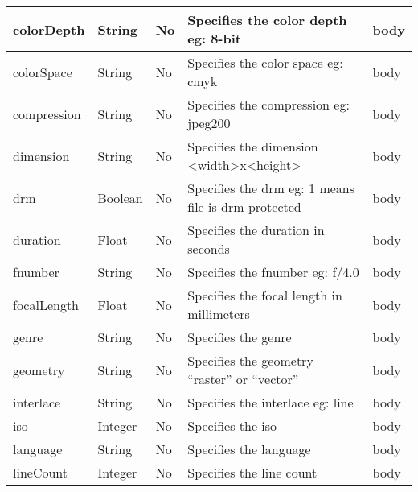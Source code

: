 \begin{longtable}{|>{\raggedright}p{}|>{\raggedright}p{}|>{\raggedright}p{}|>{\raggedright}p{}|>{\raggedright}p{}|}
\hline 
{\footnotesize{colorDepth}} & {\footnotesize{String}} & {\footnotesize{No}} & {\footnotesize{Specifies the color depth eg: 8-bit}} & {\footnotesize{body}}\tabularnewline
\hline 
{\footnotesize{colorSpace}} & {\footnotesize{String}} & {\footnotesize{No}} & {\footnotesize{Specifies the color space eg: cmyk}} & {\footnotesize{body}}\tabularnewline
\hline 
{\footnotesize{compression}} & {\footnotesize{String}} & {\footnotesize{No}} & {\footnotesize{Specifies the compression eg: jpeg200}} & {\footnotesize{body}}\tabularnewline
\hline 
{\footnotesize{dimension}} & {\footnotesize{String}} & {\footnotesize{No}} & {\footnotesize{Specifies the dimension <width>x<height>}} & {\footnotesize{body}}\tabularnewline
\hline 
{\footnotesize{drm}} & {\footnotesize{Boolean}} & {\footnotesize{No}} & {\footnotesize{Specifies the drm eg: 1 means file is drm protected}} & {\footnotesize{body}}\tabularnewline
\hline 
{\footnotesize{duration}} & {\footnotesize{Float}} & {\footnotesize{No}} & {\footnotesize{Specifies the duration in seconds}} & {\footnotesize{body}}\tabularnewline
\hline 
{\footnotesize{fnumber }}%
\begin{comment}
{\footnotesize{rename?}}
\end{comment}
{} & {\footnotesize{String}} & {\footnotesize{No}} & {\footnotesize{Specifies the fnumber eg: f/4.0}} & {\footnotesize{body}}\tabularnewline
\hline 
{\footnotesize{focalLength}} & {\footnotesize{Float}} & {\footnotesize{No}} & {\footnotesize{Specifies the focal length in millimeters}} & {\footnotesize{body}}\tabularnewline
\hline 
{\footnotesize{genre}} & {\footnotesize{String}} & {\footnotesize{No}} & {\footnotesize{Specifies the genre}} & {\footnotesize{body}}\tabularnewline
\hline 
{\footnotesize{geometry}} & {\footnotesize{String}} & {\footnotesize{No}} & {\footnotesize{Specifies the geometry “raster” or “vector”}} & {\footnotesize{body}}\tabularnewline
\hline 
{\footnotesize{interlace}} & {\footnotesize{String}} & {\footnotesize{No}} & {\footnotesize{Specifies the interlace eg: line}} & {\footnotesize{body}}\tabularnewline
\hline 
{\footnotesize{iso}}%
\begin{comment}
{\footnotesize{what is this?}}
\end{comment}
{} & {\footnotesize{Integer}} & {\footnotesize{No}} & {\footnotesize{Specifies the iso}} & {\footnotesize{body}}\tabularnewline
\hline 
{\footnotesize{language}} & {\footnotesize{String}} & {\footnotesize{No}} & {\footnotesize{Specifies the language}} & {\footnotesize{body}}\tabularnewline
\hline 
{\footnotesize{lineCount}} & {\footnotesize{Integer}} & {\footnotesize{No}} & {\footnotesize{Specifies the line count}} & {\footnotesize{body}}\tabularnewline

\end{longtable}
